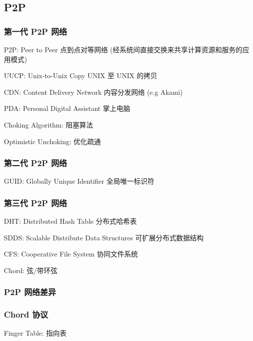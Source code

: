 \documentclass[UTF8,cs4size]{ctexart}
\begin{document}
\subsection{P2P}
\subsubsection{第一代 P2P 网络}
\begin{compactitem}
  \item P2P: Peer to Peer 点到点对等网络 (经系统间直接交换来共享计算资源和服务的应用模式)
  \item UUCP: Unix-to-Unix Copy UNIX 至 UNIX 的拷贝
  \item CDN: Content Delivery Network 内容分发网络 (e.g Akami)
  \item PDA: Personal Digital Assistant 掌上电脑
  \item Choking Algorithm: 阻塞算法
  \item Optimistic Unchoking: 优化疏通
\end{compactitem}
\subsubsection{第二代 P2P 网络}
\begin{compactitem}
  \item GUID: Globally Unique Identifier 全局唯一标识符
\end{compactitem}
\subsubsection{第三代 P2P 网络}
\begin{compactitem}
  \item DHT: Distributed Hash Table 分布式哈希表
  \item SDDS: Scalable Distribute Data Structures 可扩展分布式数据结构
  \item CFS: Cooperative File System 协同文件系统
  \item Chord: 弦/带环弦
\end{compactitem}
\subsubsection{P2P 网络差异}
\subsubsection{Chord 协议}
\begin{compactitem}
  \item Finger Table: 指向表
\end{compactitem}
\end{document}
